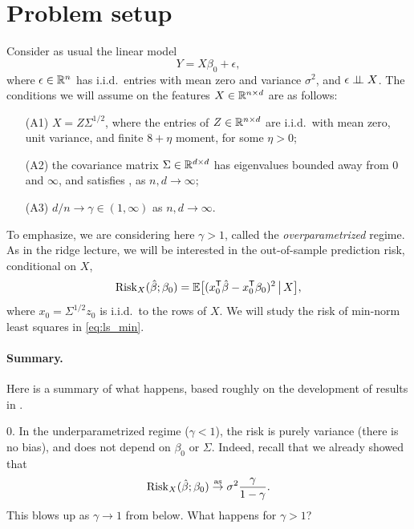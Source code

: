 \documentclass{article}
\begin{document}
\section{Problem setup}

\def\asto{\overset{\mathrm{as}}{\to}}
\def\dto{\overset{d}{\to}}
\def\Risk{\mathrm{Risk}}
\def\Bias{\mathrm{Bias}}
\def\hSigma{\hat\Sigma}

Consider as usual the linear model 
\begin{equation}
\label{eq:model}
Y = X\beta_0 + \epsilon,
\end{equation}
where $\epsilon \in \mathbb{R}^n$ has i.i.d.\ entries with mean zero and variance
$\sigma^2$, and $\epsilon \perp\!\!\!\perp X$. The conditions we will assume on the
features $X \in \mathbb{R}^{n \times d}$ are as follows:
\begin{itemize}
\item[(A1)] $X = Z \Sigma^{1/2}$, where the entries of $Z \in \mathbb{R}^{n \times d}$
  are i.i.d.\ with mean zero, unit variance, and finite $8+\eta$ moment, for
  some $\eta>0$; 
\item[(A2)] the covariance matrix $\Sigma \in \mathbb{R}^{d \times d}$ has eigenvalues
  bounded away from $0$ and $\infty$, and satisfies \smash{$F_\Sigma \dto H$},
  as $n,d \to \infty$; 
\item[(A3)] $d/n \to \gamma \in (1,\infty)$ as $n,d \to \infty$.
\end{itemize}
To emphasize, we are considering here $\gamma > 1$, called the
\emph{overparametrized} regime. As in the ridge lecture, we will be interested
in the out-of-sample prediction risk, conditional on $X$, 
\begin{equation}
\label{eq:risk}
\Risk_X(\hbeta; \beta_0) = \E \big[ ( x_0^\T \hbeta - x_0^\T \beta_0 )^2
\,\big|\, X \big],
\end{equation}
where $x_0 = \Sigma^{1/2} z_0$ is i.i.d.\ to the rows of $X$. We will study the
risk of min-norm least squares in \eqref{eq:ls_min}. 

\paragraph{Summary.}

Here is a summary of what happens, based roughly on the development of results 
in \citet{hastie2022surprises}. 

\medskip

0. In the underparametrized regime ($\gamma < 1$), the risk is purely variance
(there is no bias), and does not depend on $\beta_0$ or $\Sigma$. Indeed, recall
that we already showed that
\begin{equation}
\label{eq:ls_risk_limit}
\Risk_X(\hbeta; \beta_0) \asto \sigma^2 \frac{\gamma}{1-\gamma}.
\end{equation}
This blows up as $\gamma \to 1$ from below. What happens for $\gamma > 1$?   
\end{document}
